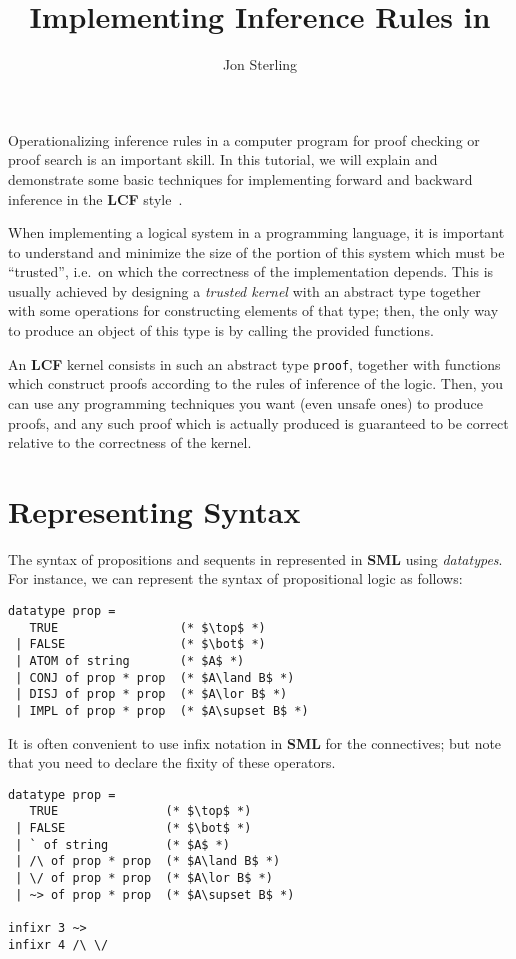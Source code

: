 \documentclass{article}
\title{Implementing Inference Rules in \StandardML}
\author{Jon Sterling}
\newcommand\FormatLang[1]{{\bfseries\sffamily #1}}
\newcommand\SML{\FormatLang{SML}}
\newcommand\LCF{\FormatLang{LCF}}
\theoremstyle{definition}
\theoremstyle{remark}
\begin{document}
\maketitle

Operationalizing inference rules in a computer program for proof
checking or proof search is an important skill. In this tutorial, we
will explain and demonstrate some basic techniques for implementing
forward and backward inference in the \LCF{}
style~\cite{gordon-milner-wadsworth:1979,paulson:1987,gordon:2000}.

When implementing a logical system in a programming language, it is
important to understand and minimize the size of the portion of this
system which must be ``trusted'', i.e.\ on which the correctness of
the implementation depends. This is usually achieved by designing a
\emph{trusted kernel} with an abstract type together with some
operations for constructing elements of that type; then, the only way
to produce an object of this type is by calling the provided
functions.

An \LCF{} kernel consists in such an abstract type \verb|proof|,
together with functions which construct proofs according to the rules
of inference of the logic. Then, you can use any programming
techniques you want (even unsafe ones) to produce proofs, and any such
proof which is actually produced is guaranteed to be correct relative
to the correctness of the kernel.

\section{Representing Syntax}

The syntax of propositions and sequents in represented in \SML{} using
\emph{datatypes}. For instance, we can represent the syntax of
propositional logic as follows:

\begin{verbatim}
datatype prop =
   TRUE                 (* $\top$ *)
 | FALSE                (* $\bot$ *)
 | ATOM of string       (* $A$ *)
 | CONJ of prop * prop  (* $A\land B$ *)
 | DISJ of prop * prop  (* $A\lor B$ *)
 | IMPL of prop * prop  (* $A\supset B$ *)
\end{verbatim}

It is often convenient to use infix notation in \SML{} for the
connectives; but note that you need to declare the fixity of these
operators.

\begin{verbatim}
datatype prop =
   TRUE               (* $\top$ *)
 | FALSE              (* $\bot$ *)
 | ` of string        (* $A$ *)
 | /\ of prop * prop  (* $A\land B$ *)
 | \/ of prop * prop  (* $A\lor B$ *)
 | ~> of prop * prop  (* $A\supset B$ *)

infixr 3 ~>
infixr 4 /\ \/
\end{verbatim}
\end{document}
